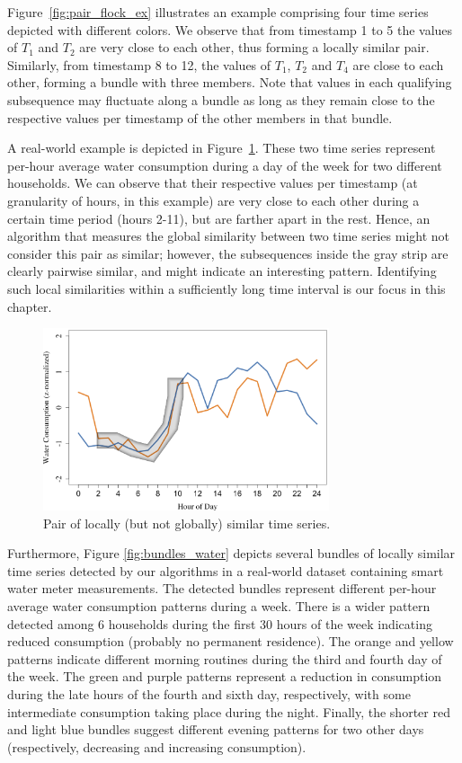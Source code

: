 Figure~\ref{fig:pair_flock_ex} illustrates an example comprising four time series depicted with different colors. We observe that from timestamp 1 to 5 the values of $T_1$ and $T_2$ are very close to each other, thus forming a locally similar pair. Similarly, from timestamp 8 to 12, the values of $T_1$, $T_2$ and $T_4$ are close to each other, forming a bundle with three members. Note that values in each qualifying subsequence may fluctuate along a bundle as long as they remain close to the respective values per timestamp of the other members in that bundle.

A real-world example is depicted in Figure~\ref{fig:water_real_ex}. These two time series represent per-hour average water consumption during a day of the week for two different households. We can observe that their respective values per timestamp (at granularity of hours, in this example) are very close to each other during a certain time period (hours 2-11), but are farther apart in the rest. Hence, an algorithm that measures the global similarity between two time series might not consider this pair as similar; however, the subsequences inside the gray strip are clearly pairwise similar, and might indicate an interesting pattern. Identifying such local similarities within a sufficiently long time interval is our focus in this chapter.

\begin{figure}[tb]
    \centering
    \includegraphics[width=0.75\textwidth]{figures/water_real_ex.png}
    \caption{Pair of locally (but not globally) similar time series.} 
    \label{fig:water_real_ex}
\end{figure}

Furthermore, Figure \ref{fig:bundles_water} depicts several bundles of locally similar time series detected by our algorithms in a real-world dataset containing smart water meter measurements. The detected bundles represent different per-hour average water consumption patterns during a week. There is a wider pattern detected among 6 households during the first 30 hours of the week indicating reduced consumption (probably no permanent residence). The orange and yellow patterns indicate different morning routines during the third and fourth day of the week. The green and purple patterns represent a reduction in consumption during the late hours of the fourth and sixth day, respectively, with some intermediate consumption taking place during the night. Finally, the shorter red and light blue bundles suggest different evening patterns for two other days (respectively, decreasing and increasing consumption).

